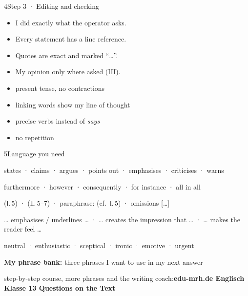 \begin{wsbox}{4}{Step 3 · Editing and checking}
\begin{minipage}[t]{0.485\linewidth}\vspace{0pt}
\begin{itemize}[label=$\square$,itemsep=1mm]
\item I did exactly what the operator asks.
\item Every statement has a line reference.
\item Quotes are exact and marked “…”.
\item My opinion only where asked (III).
\end{itemize}
\end{minipage}\hfill
\begin{minipage}[t]{0.485\linewidth}\vspace{0pt}
\begin{itemize}[label=$\square$,itemsep=1mm]
\item present tense, no contractions
\item linking words show my line of thought
\item precise verbs instead of \emph{says}
\item no repetition
\end{itemize}
\end{minipage}
\end{wsbox}

\begin{wsbox}{5}{Language you need}
\begin{minipage}[t]{0.485\linewidth}\vspace{0pt}
\par
states · claims · argues · points out · emphasises · criticises · warns\par\vspace{1.5mm}
\par
furthermore · however · consequently · for instance · all in all\par\vspace{1.5mm}
\par
(l.\,5) · (ll.\,5–7) · paraphrase: (cf.\ l.\,5) · omissions […]
\end{minipage}\hfill
\begin{minipage}[t]{0.485\linewidth}\vspace{0pt}
\par
… emphasises / underlines … · … creates the impression that … · … makes the reader feel …\par\vspace{1.5mm}
\par
neutral · enthusiastic · sceptical · ironic · emotive · urgent
\end{minipage}
\par\vspace{2mm}
\textcolor{sec}{\small\textbf{My phrase bank:} three phrases I want to use in my next answer}
\end{wsbox}

\vspace{1mm}
\begin{secbox}
 step-by-step course, more phrases and the writing coach:\enspace \textbf{edu-mrh.de \pfeil Englisch \pfeil Klasse 13 \pfeil Questions on the Text}
\end{secbox}


